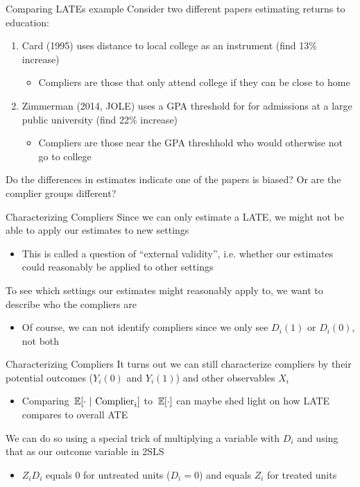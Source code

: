 \documentclass[aspectratio=169,t,11pt,table]{beamer}
\begin{document}
\begin{frame}{Comparing LATEs example}
  Consider two different papers estimating returns to education:
  \begin{enumerate}
    \item Card (1995) uses distance to local college as an instrument (find 13\% increase)
    \begin{itemize}
      \item Compliers are those that only attend college if they can be close to home
    \end{itemize}
    
    \bigskip
    \item Zimmerman (2014, JOLE) uses a GPA threshold for for admissions at a large public university (find 22\% increase)
    \begin{itemize}
      \item Compliers are those near the GPA threshhold who would otherwise not go to college
    \end{itemize}
  \end{enumerate}

  \bigskip
  Do the differences in estimates indicate one of the papers is biased? Or are the complier groups different?
\end{frame}

\begin{frame}{Characterizing Compliers}
  Since we can only estimate a LATE, we might not be able to apply our estimates to new settings
  \begin{itemize}
    \item This is called a question of ``external validity'', i.e. whether our estimates could reasonably be applied to other settings
  \end{itemize}
  
  \bigskip
  To see which settings our estimates might reasonably apply to, we want to describe who the compliers are
  \begin{itemize}
    \item Of course, we can not identify compliers since we only see $D_i(1)$ or $D_i(0)$, not both
  \end{itemize}
\end{frame}

\begin{frame}{Characterizing Compliers}
  It turns out we can still characterize compliers by their potential outcomes ($Y_i(0)$ and $Y_i(1)$) and other observables $X_i$
  \begin{itemize}
    \item Comparing $\expec{ \cdot }{\text{Complier}_i}$ to $\expec{ \cdot }$ can maybe shed light on how LATE compares to overall ATE
  \end{itemize}

  \bigskip
  We can do so using a special trick of multiplying a variable with $D_i$ and using that as our outcome variable in 2SLS 
  \begin{itemize}
    \item $Z_i D_i$ equals 0 for untreated units ($D_i = 0$) and equals $Z_i$ for treated units
  \end{itemize}
\end{frame}
\end{document}
